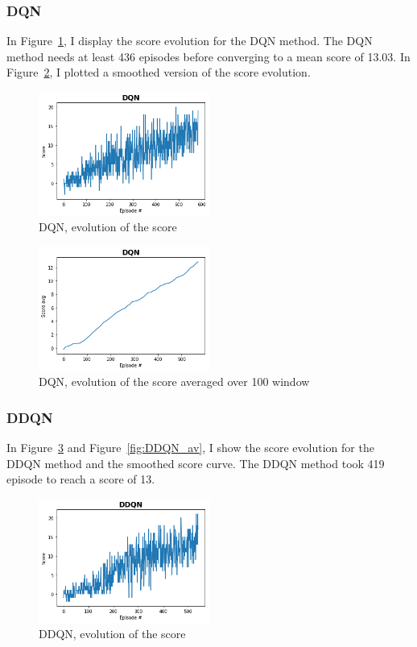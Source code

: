 \documentclass[12pt]{article}
\begin{document}
\subsubsection{DQN}
In Figure~\ref{fig:DQN}, I display the score evolution for the DQN method. The DQN method needs at least 436 episodes before converging to a mean score of 13.03.  In Figure~\ref{fig:DQN_smooth}, I plotted a smoothed version of the score evolution.

\begin{figure}[H]
  \centering
  \includegraphics[width=0.5\textwidth]{../PNG/dqn.png}
  \caption{DQN, evolution of the score}
  \label{fig:DQN}
\end{figure}

\begin{figure}[H]
 \centering
  \includegraphics[width=0.5\textwidth]{../PNG/dqn_smooth.png}
  \caption{DQN, evolution of the score averaged over 100 window}
  \label{fig:DQN_smooth}
\end{figure}


\subsubsection{DDQN}
In Figure~\ref{fig:DDQN} and Figure~\ref{fig:DDQN_av}, I show the score evolution for the DDQN method and the smoothed score curve. The DDQN method took 419 episode to reach a score of 13.
\begin{figure}[H]
 \centering
  \includegraphics[width=0.5\textwidth]{../PNG/ddqn.png}
  \caption{DDQN, evolution of the score}
  \label{fig:DDQN}
\end{figure}
\end{document}
